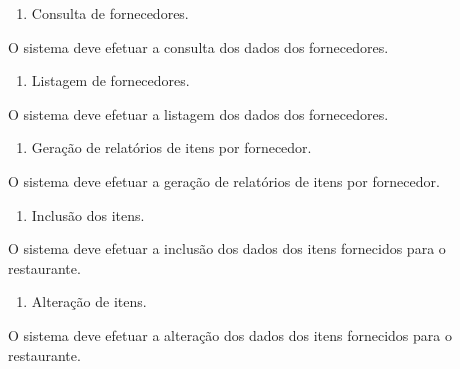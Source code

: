 \liststyleWWNumi
\setcounter{saveenum}{\value{enumi}}
\begin{enumerate}
\setcounter{enumi}{\value{saveenum}}
\item {
\textcolor[rgb]{0.078431375,0.09411765,0.13725491}{Consulta de fornecedores.}}
\end{enumerate}
{
\textcolor[rgb]{0.078431375,0.09411765,0.13725491}{O sistema deve efetuar a consulta dos dados dos fornecedores.}}

\liststyleWWNumi
\setcounter{saveenum}{\value{enumi}}
\begin{enumerate}
\setcounter{enumi}{\value{saveenum}}
\item {
\textcolor[rgb]{0.078431375,0.09411765,0.13725491}{Listagem de fornecedores.}}
\end{enumerate}
{
\textcolor[rgb]{0.078431375,0.09411765,0.13725491}{O sistema deve efetuar a listagem dos dados dos fornecedores.}}

\liststyleWWNumi
\setcounter{saveenum}{\value{enumi}}
\begin{enumerate}
\setcounter{enumi}{\value{saveenum}}
\item {
\textcolor[rgb]{0.078431375,0.09411765,0.13725491}{Geração de relatórios de itens por fornecedor.}}
\end{enumerate}
{
\textcolor[rgb]{0.078431375,0.09411765,0.13725491}{O sistema deve efetuar a geração de relatórios de itens por
fornecedor.}}


\bigskip


\bigskip

\liststyleWWNumi
\setcounter{saveenum}{\value{enumi}}
\begin{enumerate}
\setcounter{enumi}{\value{saveenum}}
\item {
\textcolor[rgb]{0.078431375,0.09411765,0.13725491}{Inclusão dos itens.}}
\end{enumerate}
{
\textcolor[rgb]{0.078431375,0.09411765,0.13725491}{O sistema deve efetuar a inclusão dos dados dos itens fornecidos para
o restaurante.}}

\liststyleWWNumi
\setcounter{saveenum}{\value{enumi}}
\begin{enumerate}
\setcounter{enumi}{\value{saveenum}}
\item {
\textcolor[rgb]{0.078431375,0.09411765,0.13725491}{Alteração de itens.}}
\end{enumerate}
{
\textcolor[rgb]{0.078431375,0.09411765,0.13725491}{O sistema deve efetuar a alteração dos dados dos itens fornecidos
para o restaurante.}}


